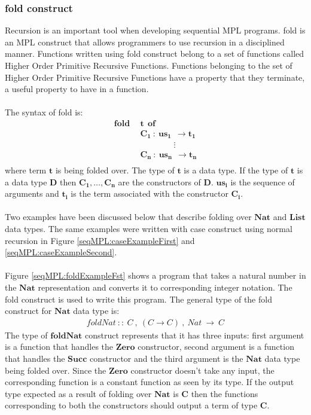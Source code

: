 \documentclass[11pt]{article}
\begin{document}
\subsubsection {fold construct}\label{SeqMPL:foldConstruct}
Recursion is an important tool when developing sequential MPL programs. {\sf fold} is an MPL construct that allows programmers to use recursion in a disciplined manner. Functions written using {\sf fold} construct belong to a set of functions called Higher Order Primitive Recursive Functions. Functions belonging to the set of Higher Order Primitive Recursive Functions have a property that they terminate, a useful property to have in a function.
~~\\~~\\
The syntax of {\sf fold} is:
\begin{align*}
      \mathbf{fold~~}&\mathbf{t~~ of}\\
      &\mathbf{C_1~:~us_1~~\to t_1} \\
      &\mathbf{\qquad\qquad \vdots} \\
      &\mathbf{C_n~:~us_n~~\to t_n}\\
\end{align*}
where term $\mathbf{t}$ is being folded over. The type of $\mathbf{t}$ is a data type. If the type of $\mathbf{t}$ is a data type $\mathbf{D}$ then $\mathbf{C_1,\ldots,C_n}$ are the constructors of $\mathbf{D}$. $\mathbf{us_i}$ is the sequence of arguments and $\mathbf{t_i}$ is the term associated with the constructor $\mathbf{C_i}$.
~~\\~~\\
Two examples have been discussed below that describe folding over $\mathbf{Nat}$ and $\mathbf{List}$ data types. The same examples were written with {\sf case} construct using normal recursion in Figure \ref{seqMPL:caseExampleFirst} and \ref{seqMPL:caseExampleSecond}.
~~\\~~\\ 
Figure \ref {seqMPL:foldExampleFst} shows a program that takes a natural number in the $\mathbf{Nat}$ representation and converts it to corresponding integer notation. The {\sf fold} construct is used to write this program. The general type of the {\sf fold} construct for $\mathbf{Nat}$ data type is:
\begin{align*}
  foldNat~::~C~,~(C \to C)~,~ Nat ~\to~ C
\end{align*}
The type of $\mathbf{foldNat}$ construct represents that it has three inputs: first argument is a function that handles the $\mathbf{Zero}$ constructor, second argument is a function that handles the $\mathbf{Succ}$ constructor and the third argument is the $\mathbf{Nat}$ data type being folded over. Since the $\mathbf{Zero}$ constructor doesn't take any input, the corresponding function is a constant function as seen by its type. If the output type expected as a result of folding over $\mathbf{Nat}$ is $\mathbf{C}$ then the functions corresponding to both the constructors should output a term of type $\mathbf{C}$. 
\end{document}
